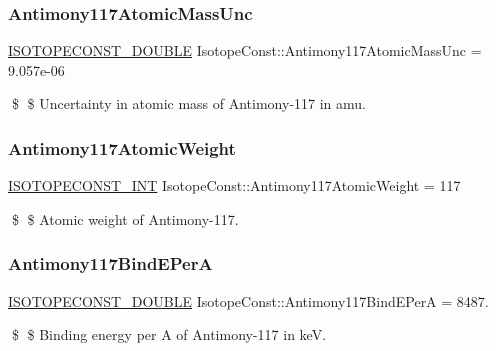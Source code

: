 \subsubsection{\texorpdfstring{Antimony117\+Atomic\+Mass\+Unc}{Antimony117AtomicMassUnc}}
{\footnotesize\ttfamily \mbox{\hyperlink{group___isotope_const-_macros_ga8f45a7272ce02c0b4c65c44636ed719a}{I\+S\+O\+T\+O\+P\+E\+C\+O\+N\+S\+T\+\_\+\+D\+O\+U\+B\+LE}} Isotope\+Const\+::\+Antimony117\+Atomic\+Mass\+Unc = 9.\+057e-\/06}

\$ \$ Uncertainty in atomic mass of Antimony-\/117 in amu. \mbox{\label{group___isotope_const-_antimony-_sb117_ga9624b270c38e803db211d0d4fe2ca164}} 
\subsubsection{\texorpdfstring{Antimony117\+Atomic\+Weight}{Antimony117AtomicWeight}}
{\footnotesize\ttfamily \mbox{\hyperlink{group___isotope_const-_macros_ga5f18360b3e99483a35c32d789e62621c}{I\+S\+O\+T\+O\+P\+E\+C\+O\+N\+S\+T\+\_\+\+I\+NT}} Isotope\+Const\+::\+Antimony117\+Atomic\+Weight = 117}

\$ \$ Atomic weight of Antimony-\/117. \mbox{\label{group___isotope_const-_antimony-_sb117_gab18f973e867f5442539eb44ea81d6501}} 
\subsubsection{\texorpdfstring{Antimony117\+Bind\+E\+PerA}{Antimony117BindEPerA}}
{\footnotesize\ttfamily \mbox{\hyperlink{group___isotope_const-_macros_ga8f45a7272ce02c0b4c65c44636ed719a}{I\+S\+O\+T\+O\+P\+E\+C\+O\+N\+S\+T\+\_\+\+D\+O\+U\+B\+LE}} Isotope\+Const\+::\+Antimony117\+Bind\+E\+PerA = 8487.}

\$ \$ Binding energy per A of Antimony-\/117 in keV. \mbox{\label{group___isotope_const-_antimony-_sb117_ga8635e51dfdd3bc3c92c9fed700081a86}} 
